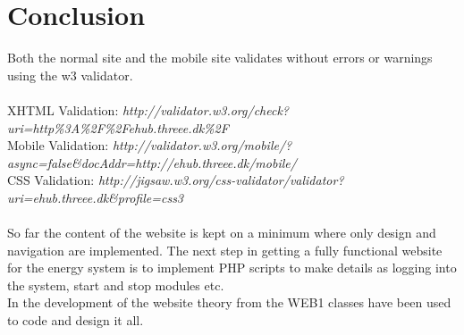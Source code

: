 \chapter{Conclusion}
Both the normal site and the mobile site validates without errors or warnings using the w3 validator. 
\\\\XHTML Validation: \textit{http://validator.w3.org/check?uri=http\%3A\%2F\%2Fehub.threee.dk\%2F}
\\Mobile Validation: \textit{http://validator.w3.org/mobile/?async=false\&docAddr=http://ehub.threee.dk/mobile/}
\\CSS Validation: \textit{http://jigsaw.w3.org/css-validator/validator?uri=ehub.threee.dk\&profile=css3}
\\\\So far the content of the website is kept on a minimum where only design and navigation are implemented. The next step in getting a fully functional website for the energy system is to implement PHP scripts to make details as logging into the system, start and stop modules etc.
\\In the development of the website theory from the WEB1 classes have been used to code and design it all.
